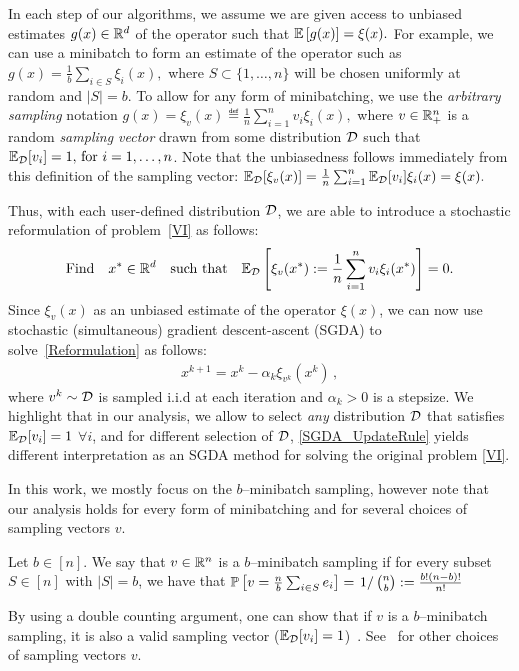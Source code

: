 \documentclass{article}
\begin{document}
In each step of our algorithms, we assume we are given access to unbiased estimates $g(x) \in \mathbb{R}^d$ of the operator such that ${\mathbb{E}\left[g(x)\right] }  = \xi(x).$  For example, we can use a minibatch to form an estimate of the operator such as $g(x) = \frac{1}{b}\sum_{i\in S}\xi_i(x),$ where $S \subset \{1,\ldots, n\}$ will be chosen uniformly at random and $|S|=b.$ 
To allow for any form of minibatching, we use the \emph{arbitrary sampling} notation $g(x) = \xi_v(x) \eqdef \frac{1}{n} \sum _{i=1}^n v_i \xi_i(x),$ where $v\in\mathbb{R}^n_+$ is a random \emph{sampling vector} drawn from some distribution ${\cal D}$ such that $\mathbb{E}_{{\cal D}}[v_i]  = 1, \,\mbox{for }i=1,\ldots, n$. 
Note that the unbiasedness follows immediately from this definition of the sampling vector: $\mathbb{E}_{{\cal D}}[\xi_v(x)] =\frac{1}{n} \sum _{i=1}^n \mathbb{E}_{{\cal D}}[v_i] \xi_i(x) = \xi(x).$ 

Thus, with each user-defined distribution ${\cal D}$, we are able to introduce a stochastic reformulation of problem~\eqref{VI} as follows:
\vspace{-3mm}
\begin{equation}
\label{Reformulation}
\text{Find} \quad  x^* \in \mathbb{R}^d \quad \text{such that} \quad \mathbb{E}_{\cal D}\left[\xi_v(x^*):=\frac{1}{n}\sum_{i=1}^n v_i \xi_i(x^*) \right]=0.
\end{equation}
Since $\xi_v(x)$ as an unbiased estimate of the operator $\xi(x)$, we can now use stochastic (simultaneous) gradient descent-ascent (SGDA) to solve~\eqref{Reformulation} as follows:
 \begin{eqnarray}  
 \label{SGDA_UpdateRule}
 x^{k+1} =  x^k- \alpha_k  \xi_{v^k}(x^k) \, ,  
\end{eqnarray} 
where $v^k \sim {\cal D}$ is sampled i.i.d at each iteration and $\alpha_k >0$ is a stepsize. We highlight that in our analysis, we allow to select \emph{any} distribution ${\cal D}$ that satisfies $\mathbb{E}_{{\cal D}}[v_i]  = 1$ $\forall i$, and for different selection of ${\cal D}$, \eqref{SGDA_UpdateRule} yields different interpretation as an SGDA method for solving the original problem \eqref{VI}.  

In this work, we mostly focus on the $b$--minibatch sampling, however note that our analysis holds for every form of minibatching and for several choices of sampling vectors $v$.
\begin{definition}\label{def:minibatch}
Let $b \in [n]$. We say that $v \in \mathbb{R}^n$ is a $b$--minibatch sampling if
for every subset $S \in [n]$ with $|S| =b$, we have that $\mathbb{P} \left[ v=\frac{n}{b}\sum_{i \in S} e_i\right]=\left.1 \right/\binom{n}{b} := \frac{b!(n-b)!}{n!}$
\end{definition}
By using a double counting argument, one can show that if $v$ is a $b$--minibatch sampling, it is also a valid sampling vector ($\mathbb{E}_{{\cal D}}[v_i]  = 1$)~\citep{gower2019sgd}. See~\cite{gower2019sgd} for other choices of sampling vectors $v$.
\end{document}
